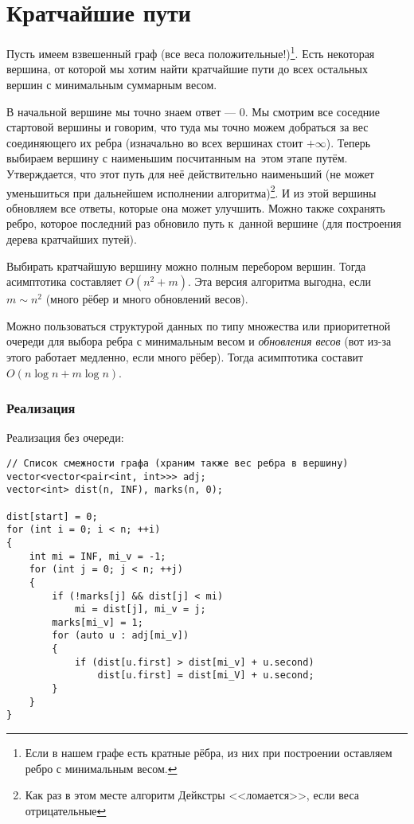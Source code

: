 \section{Кратчайшие пути}

Пусть имеем взвешенный граф (все веса положительные!)\footnote{Если в нашем графе есть кратные рёбра, из них при построении оставляем ребро с минимальным весом.}. Есть некоторая вершина, от которой мы хотим найти кратчайшие пути до всех остальных вершин с минимальным суммарным весом.

В начальной вершине мы точно знаем ответ --- $0$. Мы смотрим все соседние стартовой вершины и говорим, что туда мы точно можем добраться за вес соединяющего их ребра (изначально во всех вершинах стоит $+\infty$). Теперь выбираем вершину с наименьшим посчитанным на~этом этапе путём. Утверждается, что этот путь для неё действительно наименьший (не может уменьшиться при дальнейшем исполнении алгоритма)\footnote{Как раз в этом месте алгоритм Дейкстры <<ломается>>, если веса отрицательные}. И из этой вершины обновляем все ответы, которые она может улучшить. Можно также сохранять ребро, которое последний раз обновило путь к~данной вершине (для построения дерева кратчайших путей).

Выбирать кратчайшую вершину можно полным перебором вершин. Тогда асимптотика составляет $O(n^2 + m)$. Эта версия алгоритма выгодна, если $m \sim n^2$ (много рёбер и много обновлений весов).

Можно пользоваться структурой данных по типу множества или приоритетной очереди для выбора ребра с минимальным весом и \textit{обновления весов} (вот из-за этого работает медленно, если много рёбер). Тогда асимптотика составит $O(n\log n + m\log n)$.

\subsubsection{Реализация}

Реализация без очереди:

\begin{verbatim}
// Список смежности графа (храним также вес ребра в вершину)
vector<vector<pair<int, int>>> adj;
vector<int> dist(n, INF), marks(n, 0);

dist[start] = 0;
for (int i = 0; i < n; ++i)
{
    int mi = INF, mi_v = -1;
    for (int j = 0; j < n; ++j)
    {
        if (!marks[j] && dist[j] < mi)
            mi = dist[j], mi_v = j;
        marks[mi_v] = 1;
        for (auto u : adj[mi_v])
        {
            if (dist[u.first] > dist[mi_v] + u.second)
                dist[u.first] = dist[mi_V] + u.second;
        }
    }
}

\end{verbatim}

